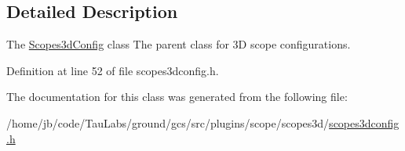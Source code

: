 \subsection{\-Detailed \-Description}
\-The \hyperlink{class_scopes3d_config}{\-Scopes3d\-Config} class \-The parent class for 3\-D scope configurations. 

\-Definition at line 52 of file scopes3dconfig.\-h.



\-The documentation for this class was generated from the following file\-:\begin{DoxyCompactItemize}
\item 
/home/jb/code/\-Tau\-Labs/ground/gcs/src/plugins/scope/scopes3d/\hyperlink{scopes3dconfig_8h}{scopes3dconfig.\-h}\end{DoxyCompactItemize}
